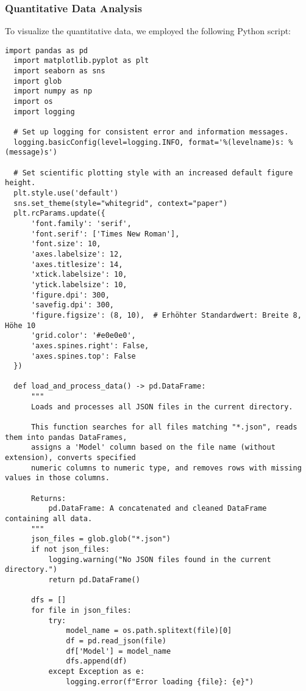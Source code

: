 \subsubsection{Quantitative Data Analysis}

To visualize the quantitative data, we employed the following Python script:


\begin{lstlisting}[style=Python, caption={Python-quantitative-data-analysis}, captionpos=b]
  import pandas as pd
  import matplotlib.pyplot as plt
  import seaborn as sns
  import glob
  import numpy as np
  import os
  import logging
  
  # Set up logging for consistent error and information messages.
  logging.basicConfig(level=logging.INFO, format='%(levelname)s: %(message)s')
  
  # Set scientific plotting style with an increased default figure height.
  plt.style.use('default')
  sns.set_theme(style="whitegrid", context="paper")
  plt.rcParams.update({
      'font.family': 'serif',
      'font.serif': ['Times New Roman'],
      'font.size': 10,
      'axes.labelsize': 12,
      'axes.titlesize': 14,
      'xtick.labelsize': 10,
      'ytick.labelsize': 10,
      'figure.dpi': 300,
      'savefig.dpi': 300,
      'figure.figsize': (8, 10),  # Erhöhter Standardwert: Breite 8, Höhe 10
      'grid.color': '#e0e0e0',
      'axes.spines.right': False,
      'axes.spines.top': False
  })
  
  def load_and_process_data() -> pd.DataFrame:
      """
      Loads and processes all JSON files in the current directory.
      
      This function searches for all files matching "*.json", reads them into pandas DataFrames,
      assigns a 'Model' column based on the file name (without extension), converts specified
      numeric columns to numeric type, and removes rows with missing values in those columns.
      
      Returns:
          pd.DataFrame: A concatenated and cleaned DataFrame containing all data.
      """
      json_files = glob.glob("*.json")
      if not json_files:
          logging.warning("No JSON files found in the current directory.")
          return pd.DataFrame()
      
      dfs = []
      for file in json_files:
          try:
              model_name = os.path.splitext(file)[0]
              df = pd.read_json(file)
              df['Model'] = model_name
              dfs.append(df)
          except Exception as e:
              logging.error(f"Error loading {file}: {e}")
      

\end{lstlisting}
